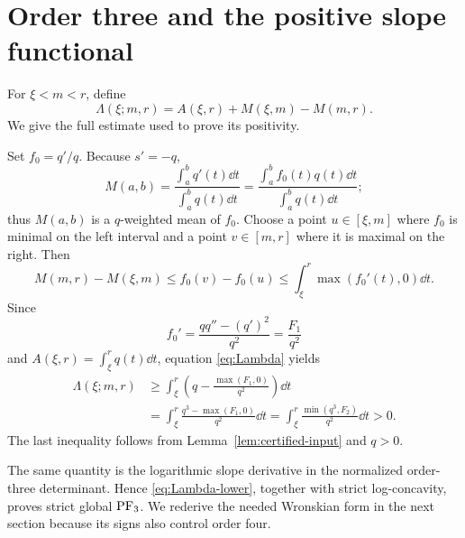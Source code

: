\section{Order three and the positive slope functional}\label{sec:pf3}

For \(\xi<m<r\), define
\begin{equation}\label{eq:Lambda}
 \Lambda(\xi;m,r)=A(\xi,r)+M(\xi,m)-M(m,r).
\end{equation}
We give the full estimate used to prove its positivity.

Set \(f_0=q'/q\). Because \(s'=-q\),
\[
 M(a,b)=\frac{\int_a^bq'(t)\dd t}{\int_a^bq(t)\dd t}
       =\frac{\int_a^b f_0(t)q(t)\dd t}{\int_a^bq(t)\dd t};
\]
thus \(M(a,b)\) is a \(q\)-weighted mean of \(f_0\). Choose a point
\(u\in[\xi,m]\) where \(f_0\) is minimal on the left interval and a point
\(v\in[m,r]\) where it is maximal on the right. Then
\[
 M(m,r)-M(\xi,m)\leq f_0(v)-f_0(u)
 \leq\int_\xi^r\max(f_0'(t),0)\dd t.
\]
Since
\[
 f_0'=\frac{qq''-(q')^2}{q^2}=\frac{F_1}{q^2}
\]
and \(A(\xi,r)=\int_\xi^r q(t)\dd t\), equation
\eqref{eq:Lambda} yields
\begin{align}
 \Lambda(\xi;m,r)
 &\geq\int_\xi^r\left(q-\frac{\max(F_1,0)}{q^2}\right)\dd t\\
 &=\int_\xi^r\frac{q^3-\max(F_1,0)}{q^2}\dd t
 =\int_\xi^r\frac{\min(q^3,F_2)}{q^2}\dd t>0.
 \label{eq:Lambda-lower}
\end{align}
The last inequality follows from Lemma~\ref{lem:certified-input} and
\(q>0\).

The same quantity is the logarithmic slope derivative in the normalized
order-three determinant. Hence \eqref{eq:Lambda-lower}, together with strict
log-concavity, proves strict global \(\mathrm{PF}_3\). We rederive the needed
Wronskian form in the next section because its signs also control order four.

